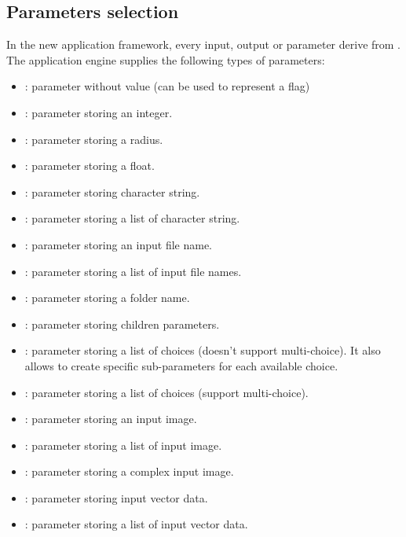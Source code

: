 \subsection{Parameters selection}
\label{sec:appParam}
In the new application framework, every input, output or parameter derive from 
. The application engine supplies the following 
types of parameters:
\begin{itemize}
  \item {} : parameter without value (can be used to represent 
  a flag)
  \item {} : parameter storing an integer.
  \item {} : parameter storing a radius.
  \item {} : parameter storing a float.
  \item {} : parameter storing character string.
  \item {} : parameter storing a list of character string.
  \item {} : parameter storing an input file name.
  \item {} : parameter storing a list of input file names.
  \item {} : parameter storing a folder name.
  \item {} : parameter storing children parameters.
  \item {} : parameter storing a list of choices (doesn't support
  multi-choice). It also allows to create specific sub-parameters for each available choice.
  \item {} : parameter storing a list of choices (support 
  multi-choice).
  \item {} : parameter storing an input image.
  \item {} : parameter storing a list of input image.
  \item {} : parameter storing a complex input image.
  \item {} : parameter storing input vector data.
  \item {} : parameter storing a list of input vector data.

\end{itemize}
